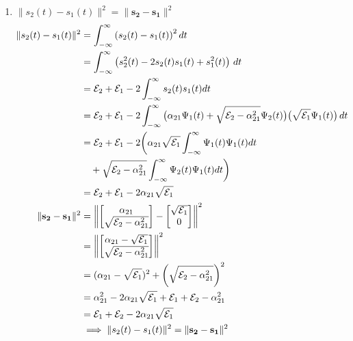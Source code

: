 \documentclass{article}
\begin{document}
\begin{enumerate}[label=2.\arabic*]
\begin{enumerate}[label=\alph*.]
        \item $\| s_2(t) - s_1(t)\|^2 = \|\mathbf{s_2} - \mathbf{s_1}\|^2$
        \begin{align*}
            \|s_2(t) - s_1(t)\|^2 &= \int_{-\infty}^{\infty} \left(s_2(t) - s_1(t)\right)^2 dt \\
            &= \int_{-\infty}^{\infty} \left(s_2^2(t) - 2s_2(t)s_1(t) + s_1^2(t)\right)\, dt \\
            &= \mathcal{E}_2 + \mathcal{E}_1 - 2\int_{-\infty}^{\infty} s_2(t)s_1(t) dt \\
            &= \mathcal{E}_2 + \mathcal{E}_1 - 2\int_{-\infty}^{\infty} 
            \big(\alpha_{21} \Psi_1(t) + \sqrt{\mathcal{E}_2 - \alpha_{21}^2}\Psi_2(t)\big)\big(\sqrt{\mathcal{E}_1}\Psi_1(t)\big) \, dt \\
            &= \mathcal{E}_2 + \mathcal{E}_1 - 2\bigg(\alpha_{21}\sqrt{\mathcal{E}_1} 
            \int_{-\infty}^{\infty} \Psi_1(t) \Psi_1(t) dt \notag \\ 
            &\quad + \sqrt{\mathcal{E}_2 - \alpha_{21}^2}\int_{-\infty}^{\infty} \Psi_2(t) \Psi_1(t) dt\bigg) \\
            &= \mathcal{E}_2 + \mathcal{E}_1 - 2\alpha_{21}\sqrt{\mathcal{E}_1} \\
            \|\mathbf{s_2} - \mathbf{s_1}\|^2 &= \left\|
            \begin{bmatrix}
                \alpha_{21} \\
                \sqrt{\mathcal{E}_2 - \alpha_{21}^2}
            \end{bmatrix} - 
            \begin{bmatrix}
                \sqrt{\mathcal{E}_1} \\
                0   
            \end{bmatrix}
            \right\|^2 \\
            &= \left\|
            \begin{bmatrix}
                \alpha_{21} - \sqrt{\mathcal{E}_1} \\
                \sqrt{\mathcal{E}_2 - \alpha_{21}^2}
            \end{bmatrix}
            \right\|^2 \\
            &= (\alpha_{21} - \sqrt{\mathcal{E}_1})^2 + \left(\sqrt{\mathcal{E}_2 - \alpha_{21}^2}\right)^2 \\
            &= \alpha_{21}^2 - 2\alpha_{21}\sqrt{\mathcal{E}_1} + \mathcal{E}_1 + \mathcal{E}_2 - \alpha_{21}^2 \\
            &= \mathcal{E}_1 + \mathcal{E}_2 - 2\alpha_{21}\sqrt{\mathcal{E}_1} \\
            &\implies \|s_2(t) - s_1(t)\|^2 = \|\mathbf{s_2} - \mathbf{s_1}\|^2
        \end{align*}
        

\end{enumerate}
\end{enumerate}
\end{document}
